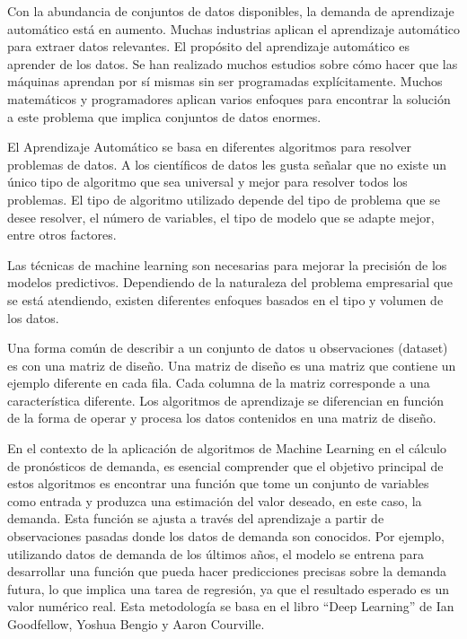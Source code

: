 \vspace{1\baselineskip}
Con la abundancia de conjuntos de datos disponibles, la demanda de aprendizaje automático está en aumento. Muchas industrias aplican el aprendizaje automático
para extraer datos relevantes. El propósito del aprendizaje automático es aprender de los datos. Se han realizado muchos estudios sobre cómo hacer que las máquinas aprendan por sí mismas sin ser programadas explícitamente. Muchos matemáticos y programadores aplican varios enfoques para encontrar la solución a este problema que implica conjuntos de datos enormes\cite{mahesh2020machine}.

\vspace{1\baselineskip}
El Aprendizaje Automático se basa en diferentes algoritmos para resolver problemas de datos. A los científicos de datos les gusta señalar que no existe un único tipo de algoritmo que sea universal y mejor para resolver todos los problemas. El tipo de algoritmo utilizado depende del tipo de problema que se desee resolver, el número de variables, el tipo de modelo que se adapte mejor, entre otros factores.

\vspace{1\baselineskip}
Las técnicas de machine learning son necesarias para mejorar la precisión de
los modelos predictivos. Dependiendo de la naturaleza del problema empresarial
que se está atendiendo, existen diferentes enfoques basados en el tipo y
volumen de los datos\cite{ibm}.

\vspace{1\baselineskip}
Una forma común de describir a un conjunto de datos u observaciones (dataset)
es con una matriz de diseño. Una matriz de diseño es una matriz que contiene un
ejemplo diferente en cada fila. Cada columna de la matriz corresponde a una
característica diferente. Los algoritmos de aprendizaje se diferencian en
función de la forma de operar y procesa los datos contenidos en una matriz de
diseño\cite{arana2021redes}.

\vspace{1\baselineskip}
En el contexto de la aplicación de algoritmos de Machine Learning en el cálculo
de pronósticos de demanda, es esencial comprender que el objetivo principal de
estos algoritmos es encontrar una función que tome un conjunto de variables
como entrada y produzca una estimación del valor deseado, en este caso, la
demanda. Esta función se ajusta a través del aprendizaje a partir de
observaciones pasadas donde los datos de demanda son conocidos. Por ejemplo,
utilizando datos de demanda de los últimos años, el modelo se entrena para
desarrollar una función que pueda hacer predicciones precisas sobre la demanda
futura, lo que implica una tarea de regresión, ya que el resultado esperado es
un valor numérico real. Esta metodología se basa en el libro “Deep Learning” de
Ian Goodfellow, Yoshua Bengio y Aaron Courville\cite{goodfellow2016deep}.

